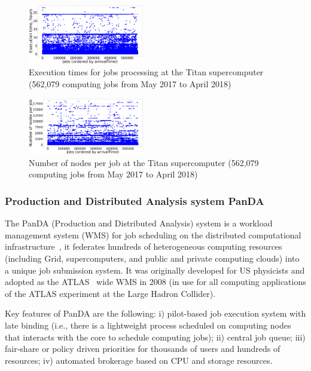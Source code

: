 \begin{figure}
    \centering
    \includegraphics[width=0.45\textwidth]{pics/titan-logs-execution-time.png}
    \caption{Execution times for jobs processing at the Titan supercomputer (562,079 computing jobs from May 2017 to April 2018)}
    \label{fig-titan-logs-execution-time} 
\end{figure}

\begin{figure}
    \centering
    \includegraphics[width=0.45\textwidth]{pics/titan-logs-nodes-count.png}
    \caption{Number of nodes per job at the Titan supercomputer (562,079 computing jobs from May 2017 to April 2018)}
    \label{fig-titan-logs-nodes-count} 
\end{figure}

\subsubsection{Production and Distributed Analysis system PanDA} \label{sec-experiments-1-2}

The PanDA (Production and Distributed Analysis) system is a workload management system (WMS) for job scheduling on the distributed computational infrastructure~\cite{ref-panda}, it federates hundreds of heterogeneous computing resources (including Grid, supercomputers, and public and private computing clouds) into a unique job submission system. It was originally developed for US physicists and adopted as the ATLAS~\cite{ref-atlas} wide WMS in 2008 (in use for all computing applications of the ATLAS experiment at the Large Hadron Collider).

Key features of PanDA are the following: i) pilot-based job execution system with late binding (i.e., there is a lightweight process scheduled on computing nodes that interacts with the core to schedule computing jobs); ii) central job queue; iii) fair-share or policy driven priorities for thousands of users and hundreds of resources; iv) automated brokerage based on CPU and storage resources.


